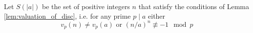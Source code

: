 \documentclass[../main.tex]{subfiles}
\begin{document}
Let $S\left( \left| a \right| \right)$ be the set of positive integers $n$ that satisfy the conditions of Lemma \ref{lem:valuation_of_disc}, i.e. for any prime $p\mid a$ either 
\[
  v_p\left( n \right) \neq v_p\left( a \right) \text{ or } \left( n / a \right)^n \not \equiv -1 \mod p
\]
\end{document}
